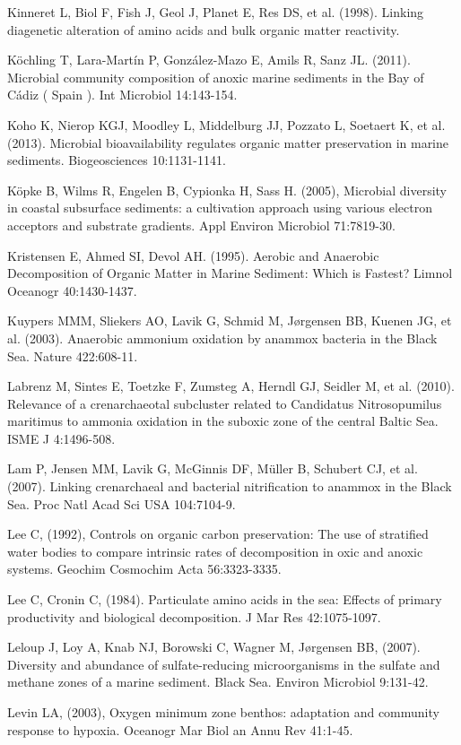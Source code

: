 Kinneret L, Biol F, Fish J, Geol J, Planet E, Res DS, et al. (1998). Linking diagenetic alteration of amino acids and bulk organic matter reactivity.

K\"ochling T, Lara-Martín P, González-Mazo E, Amils R, Sanz JL. (2011). Microbial community composition of anoxic marine sediments in the Bay of Cádiz ( Spain ). Int Microbiol 14:143-154.

Koho K, Nierop KGJ, Moodley L, Middelburg JJ, Pozzato L, Soetaert K, et al. (2013). Microbial bioavailability regulates organic matter preservation in marine sediments. Biogeosciences 10:1131-1141.

K\"opke B, Wilms R, Engelen B, Cypionka H, Sass H. (2005), Microbial diversity in coastal subsurface sediments: a cultivation approach using various electron acceptors and substrate gradients. Appl Environ Microbiol 71:7819-30.

Kristensen E, Ahmed SI, Devol AH. (1995). Aerobic and Anaerobic Decomposition of Organic Matter in Marine Sediment: Which is Fastest? Limnol Oceanogr 40:1430-1437.

Kuypers MMM, Sliekers AO, Lavik G, Schmid M, J{\o}rgensen BB, Kuenen JG, et al. (2003). Anaerobic ammonium oxidation by anammox bacteria in the Black Sea. Nature 422:608-11.

Labrenz M, Sintes E, Toetzke F, Zumsteg A, Herndl GJ, Seidler M, et al. (2010). Relevance of a crenarchaeotal subcluster related to Candidatus Nitrosopumilus maritimus to ammonia oxidation in the suboxic zone of the central Baltic Sea. ISME J 4:1496-508.

Lam P, Jensen MM, Lavik G, McGinnis DF, M\"uller B, Schubert CJ, et al. (2007). Linking crenarchaeal and bacterial nitrification to anammox in the Black Sea. Proc Natl Acad Sci USA 104:7104-9.

Lee C, (1992), Controls on organic carbon preservation: The use of stratified water bodies to compare intrinsic rates of decomposition in oxic and anoxic systems. Geochim Cosmochim Acta 56:3323-3335.

Lee C, Cronin C, (1984). Particulate amino acids in the sea: Effects of primary productivity and biological decomposition. J Mar Res 42:1075-1097.

Leloup J, Loy A, Knab NJ, Borowski C, Wagner M, J{\o}rgensen BB, (2007). Diversity and abundance of sulfate-reducing microorganisms in the sulfate and methane zones of a marine sediment. Black Sea. Environ Microbiol 9:131-42.

Levin LA, (2003), Oxygen minimum zone benthos: adaptation and community response to hypoxia. Oceanogr Mar Biol an Annu Rev 41:1-45.

